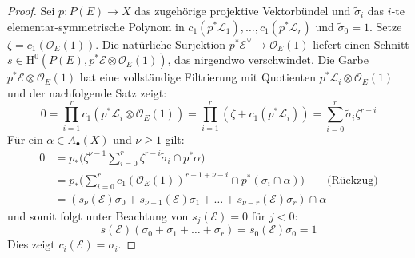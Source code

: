 \documentclass[10pt,b5paper]{article}
\begin{document}
\begin{proof}
Sei $p:P(E)\to X$ das zugehörige projektive Vektorbündel und $\tilde{\sigma}_i$ das $i$-te elementar-symmetrische Polynom in $c_1(p^\ast\mathcal{L}_1),\ldots,c_1(p^\ast\mathcal{L}_r)$ und $\tilde{\sigma}_0 = 1$. Setze $\zeta = c_1(\mathcal{O}_E(1))$. Die natürliche Surjektion $p^\ast\mathcal{E}^\vee\to \mathcal{O}_E(1)$ liefert einen Schnitt $s\in\mathrm{H}^0(P(E), p^\ast\mathcal{E}\otimes \mathcal{O}_E(1))$, das nirgendwo verschwindet. Die Garbe $p^\ast\mathcal{E}\otimes\mathcal{O}_E(1)$ hat eine vollständige Filtrierung mit Quotienten $p^\ast\mathcal{L}_i\otimes\mathcal{O}_E(1)$ und der nachfolgende Satz zeigt:
\[ 0 = \prod_{i=1}^r c_1(p^\ast\mathcal{L}_i\otimes\mathcal{O}_E(1)) = \prod_{i=1}^{r}(\zeta + c_1(p^\ast\mathcal{L}_i)) = \sum_{i=0}^r\tilde{\sigma}_i\zeta^{r-i}\]
Für ein $\alpha\in A_\bullet(X)$ und $\nu\geq 1$ gilt:
\begin{align*}
0 &= p_\ast\Big(\zeta^{\nu-1}\sum_{i=0}^r\zeta^{r-i}\tilde{\sigma}_i\cap p^\ast\alpha\Big)\\
&= p_\ast\Big(\sum_{i=0}^r c_1(\mathcal{O}_E(1))^{r-1+\nu-i}\cap p^\ast(\sigma_i\cap\alpha)\Big)\qquad \text{(Rückzug)}\\
&= (s_\nu(\mathcal{E})\sigma_0 + s_{\nu-1}(\mathcal{E})\sigma_1 + \ldots + s_{\nu-r}(\mathcal{E})\sigma_r)\cap \alpha
\end{align*}
und somit folgt unter Beachtung von $s_j(\mathcal{E}) = 0$ für $j<0$:
\[ s(\mathcal{E})(\sigma_0+\sigma_1+\ldots+\sigma_r) = s_0(\mathcal{E})\sigma_0 = 1 \]
Dies zeigt $c_i(\mathcal{E}) = \sigma_i$.
\end{proof}
\end{document}
